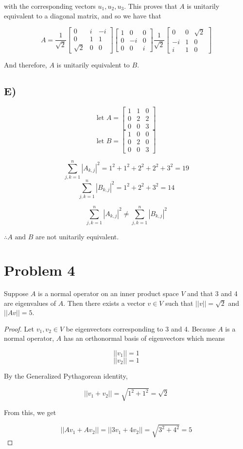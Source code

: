 \documentclass[12pt, letterpaper]{article}
\begin{document}
with the corresponding vectors $u_1, u_2, u_3$. This proves that $A$ is unitarily equivalent to a diagonal matrix, and so we have that

\[ A = \frac{1}{\sqrt{2}} \begin{bmatrix} 0 & i & -i \\ 0 & 1 & 1 \\ \sqrt{2} & 0 & 0 \end{bmatrix} \begin{bmatrix} 1 & 0 & 0 \\ 0 & -i & 0 \\ 0 & 0 & i \end{bmatrix} \frac{1}{\sqrt{2}} \begin{bmatrix} 0 & 0 & \sqrt{2} \\ -i & 1 & 0 \\ i & 1 & 0 \end{bmatrix} \]

And therefore, $A$ is unitarily equivalent to $B$. 

\subsection*{E)}
\[ \text{let } A = \begin{bmatrix} 1 & 1 & 0 \\ 0 & 2 & 2 \\ 0 & 0 & 3 \end{bmatrix} \]
\[ \text{let } B = \begin{bmatrix} 1 & 0 & 0 \\ 0 & 2 & 0 \\ 0 & 0 & 3 \end{bmatrix} \]

\[ \sum^n_{j,k=1} |A_{k,j}|^2 = 1^2 + 1^2 + 2^2 + 2^2 + 3^2 = 19 \]
\[ \sum^n_{j,k=1} |B_{k,j}|^2 = 1^2 + 2^2 + 3^2 = 14 \]

\[ \sum^n_{j,k=1} |A_{k,j}|^2 \neq \sum^n_{j,k=1} |B_{k,j}|^2 \]

$\therefore A \text{ and } B$ are not unitarily equivalent.

\section*{Problem 4}
Suppose $A$ is a normal operator on an inner product space $V$ and that 3 and 4 are eigenvalues of $A$. Then there exists a vector $v \in V$ such that $||v|| = \sqrt{2}$ and $||Av|| = 5$. 

\begin{proof}
Let $v_1, v_2 \in V$ be eigenvectors corresponding to 3 and 4. Because $A$ is a normal operator, $A$ has an orthonormal basis of eigenvectors which means

\[ ||v_1|| = 1 \]
\[ ||v_2|| = 1 \]

By the Generalized Pythagorean identity,

\[ ||v_1 + v_2|| = \sqrt{1^2 + 1^2} = \sqrt{2} \]

From this, we get

\[ ||Av_1 + Av_2|| = ||3v_1 + 4v_2|| = \sqrt{3^2 + 4^2} = 5 \]

\end{proof}
\end{document}
